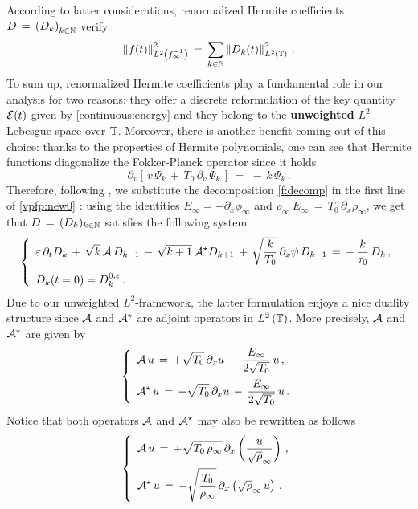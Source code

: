 \documentclass[11pt]{amsart}
\numberwithin{equation}{section}
\numberwithin{figure}{section}
\begin{document}
According to latter considerations, renormalized Hermite coefficients $
D\,=\,
\left(
D_{k}
\right)_{k\in{\mathbb N}}
$ verify
\[
\left\|f(t)\right\|^2_{L^2\left(f_{\infty}^{-1}\right)}
\,=\,
\sum_{k\in{\mathbb N}}
\left\|D_k(t)\right\|^2_{L^2\left({\mathbb T}\right)}\,.
\]
To sum up, renormalized Hermite coefficients play a fundamental role in our analysis for two reasons: they offer a discrete reformulation of the key quantity ${\mathcal E}(t)$ given by \eqref{continuous:energy} and they belong to the \textbf{unweighted} $L^2$-Lebesgue space over ${\mathbb T}$. Moreover, there is another benefit coming out of this choice: thanks to the properties of Hermite polynomials, one can see that Hermite functions diagonalize the Fokker-Planck operator since it holds
\[
\partial_{v}\left[\,
v\,\Psi_{k}
\,+\,
T_0\,\partial_{v}\,\Psi_{k}\,
\right]
\,=\,
\,-\,k
\,\Psi_{k}\,.
\]
Therefore, following \cite{BF_09_22}, we substitute the decomposition
\eqref{f:decomp} in the first line of \eqref{vpfp:new0} : using the identities $E_\infty =
-\partial_x\phi_\infty$ and $\rho_\infty \, E_{\infty} \,=\, T_0\, \partial_x\rho_\infty $, we get
that $D\,=\,(D_{k})_{k \in {\mathbb N}}$ satisfies the following system
  \begin{equation}
  \label{Hermite:D}
  \left\{
    \begin{array}{l}
  \displaystyle\varepsilon\,\partial_t D_{k} \,+\,
       \sqrt{k}\,
      {\mathcal A}\,D_{k-1}\,- \, \sqrt{k +1}\,
        {\mathcal A}^\star D_{k+1}\,+\,\sqrt{\frac{k}{T_0}}\, \partial_x\psi\,D_{k-1}
          \,  =\,  - \,  \frac{k}{\tau_0}\,  D_{k}\,,
        \\[1.2em]
         \displaystyle D_{k}(t=0) =  D^{0,\varepsilon}_{k}\,.
\end{array}\right.
\end{equation}
Due to our unweighted $L^2$-framework, the latter formulation enjoys a nice duality structure since ${\mathcal A}$ and ${\mathcal A}^{\star}$ are adjoint operators in $L^2\left({\mathbb T}\right)$. More precisely, ${\mathcal A}$ and ${\mathcal A}^{\star}$ are given by
\begin{equation*}
\left\{
\begin{array}{l}
\displaystyle  {\mathcal A} \,u  \,=\, +\sqrt{T_0}\,\partial_{x}  u \,-\,
\frac{E_{\infty}}{2\sqrt{T_0}}\, u\,, \\[1.1em]
\displaystyle{\mathcal A}^\star \,u  \,=\, -\sqrt{T_0}\,\partial_{x}  u \,-\,
\frac{E_{\infty}}{2\sqrt{T_0}}\, u\,.
\end{array}\right.
\end{equation*}
Notice that both operators ${\mathcal A}$ and ${\mathcal A}^\star$ may also be rewritten as follows
\begin{equation*}
	\left\{
	\begin{array}{l}
		\displaystyle  {\mathcal A} \,u  \,=\, +\sqrt{T_0\,\rho_{\infty}}\,\partial_x
		\left(
		\frac{u}{\sqrt{\rho}_{\infty}}\right)
		\,, \\[1.1em]
		\displaystyle  {\mathcal A}^{\star} \,u  \,=\, -\sqrt{\frac{T_0}{\rho_{\infty}}}\,\partial_x
		\left(
		\sqrt{\rho}_{\infty}\,u\right)
		\,.
	\end{array}\right.
\end{equation*}
\end{document}
